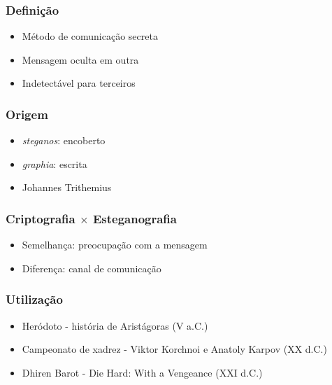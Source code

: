 \documentclass{beamer}
\begin{document}
\begin{frame}
\frametitle{Definição}
\begin{itemize}
\item Método de comunicação secreta \newline
\item Mensagem oculta em outra \newline
\item Indetectável para terceiros


\end{itemize}
\end{frame}

\begin{frame}
\frametitle{Origem}
\begin{itemize}
\item \textit{steganos}: encoberto \newline
\item \textit{graphia}: escrita\newline
\item Johannes Trithemius 
\end{itemize}
\end{frame}

\begin{frame}
\frametitle{Criptografia $\times$ Esteganografia}
\begin{itemize}
\item Semelhança: preocupação com a mensagem \newline
\item Diferença: canal de comunicação
\end{itemize}
\end{frame}


\begin{frame}
\frametitle{Utilização}
\begin{itemize}
\item Heródoto - história de Aristágoras (V a.C.)\newline
\item Campeonato de xadrez - Viktor Korchnoi e Anatoly Karpov (XX d.C.)\newline
\item Dhiren Barot - Die Hard: With a Vengeance (XXI d.C.)\newline
\end{itemize}
\end{frame}
\end{document}
